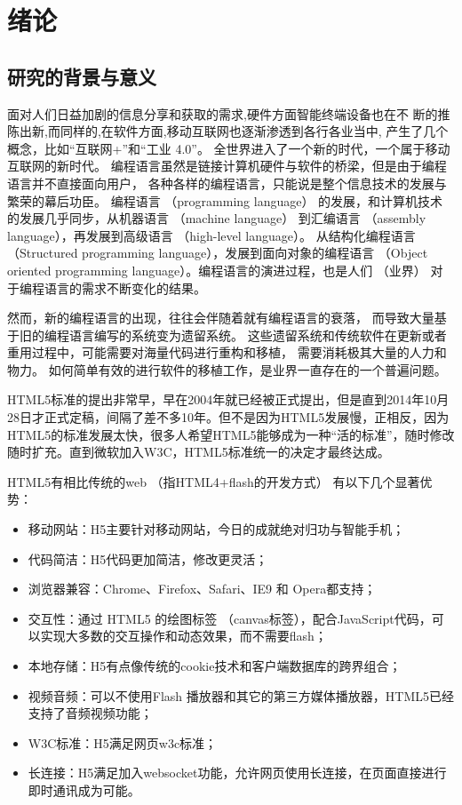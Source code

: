 \chapter{绪论}

\section{研究的背景与意义}

面对人们日益加剧的信息分享和获取的需求,硬件方面智能终端设备也在不
断的推陈出新,而同样的,在软件方面,移动互联网也逐渐渗透到各行各业当中, 
产生了几个概念，比如“互联网+”和“工业 4.0”。
全世界进入了一个新的时代，一个属于移动互联网的新时代。
编程语言虽然是链接计算机硬件与软件的桥梁，但是由于编程语言并不直接面向用户，
各种各样的编程语言，只能说是整个信息技术的发展与繁荣的幕后功臣。
编程语言 （programming language） 的发展，和计算机技术的发展几乎同步，从机器语言 （machine language） 到汇编语言 （assembly language），再发展到高级语言 （high-level language）。
从结构化编程语言 （Structured programming language），发展到面向对象的编程语言 （Object oriented programming language）。编程语言的演进过程，也是人们 （业界） 对于编程语言的需求不断变化的结果。

然而，新的编程语言的出现，往往会伴随着就有编程语言的衰落，
而导致大量基于旧的编程语言编写的系统变为遗留系统。
这些遗留系统和传统软件在更新或者重用过程中，可能需要对海量代码进行重构和移植，
需要消耗极其大量的人力和物力。
如何简单有效的进行软件的移植工作，是业界一直存在的一个普遍问题。

HTML5标准的提出非常早，早在2004年就已经被正式提出，但是直到2014年10月28日才正式定稿，间隔了差不多10年。但不是因为HTML5发展慢，正相反，因为HTML5的标准发展太快，很多人希望HTML5能够成为一种“活的标准”，随时修改随时扩充。直到微软加入W3C，HTML5标准统一的决定才最终达成。

HTML5有相比传统的web （指HTML4+flash的开发方式） 有以下几个显著优势：

\begin{itemize}[itemindent=2em]
    \item {\heiti 移动网站：}H5主要针对移动网站，今日的成就绝对归功与智能手机；
    \item {\heiti 代码简洁：}H5代码更加简洁，修改更灵活；
    \item {\heiti 浏览器兼容：}Chrome、Firefox、Safari、IE9 和 Opera都支持； 
    \item {\heiti 交互性：}通过 HTML5 的绘图标签 （canvas标签），配合JavaScript代码，可以实现大多数的交互操作和动态效果，而不需要flash；
    \item {\heiti 本地存储：}H5有点像传统的cookie技术和客户端数据库的跨界组合；
    \item {\heiti 视频音频：}可以不使用Flash 播放器和其它的第三方媒体播放器，HTML5已经支持了音频视频功能；
    \item {\heiti W3C标准：}H5满足网页w3c标准；
    \item {\heiti 长连接：}H5满足加入websocket功能，允许网页使用长连接，在页面直接进行即时通讯成为可能。
\end{itemize}


